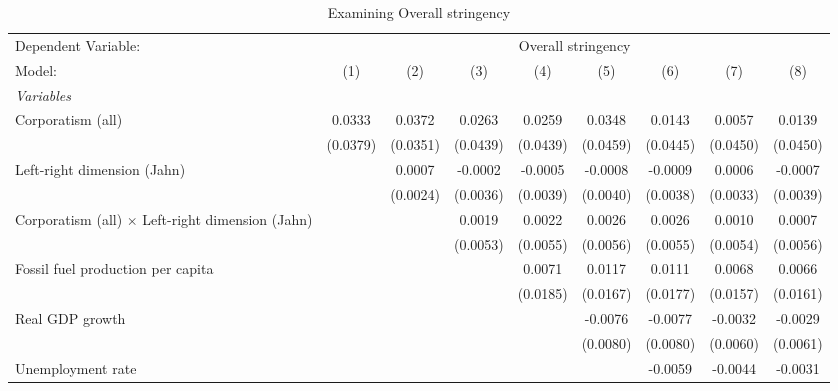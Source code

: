 
\begin{table}[htbp]
   \caption{Examining Overall stringency}
   \centering
   \begin{tabular}{lcccccccc}
      \tabularnewline \midrule \midrule
      Dependent Variable: & \multicolumn{8}{c}{Overall stringency}\\
      Model:                                                  & (1)      & (2)      & (3)      & (4)      & (5)      & (6)      & (7)      & (8)\\  
      \midrule
      \emph{Variables}\\
      Corporatism (all)                                       & 0.0333   & 0.0372   & 0.0263   & 0.0259   & 0.0348   & 0.0143   & 0.0057   & 0.0139\\   
                                                              & (0.0379) & (0.0351) & (0.0439) & (0.0439) & (0.0459) & (0.0445) & (0.0450) & (0.0450)\\   
      Left-right dimension (Jahn)                             &          & 0.0007   & -0.0002  & -0.0005  & -0.0008  & -0.0009  & 0.0006   & -0.0007\\   
                                                              &          & (0.0024) & (0.0036) & (0.0039) & (0.0040) & (0.0038) & (0.0033) & (0.0039)\\   
      Corporatism (all) $\times$ Left-right dimension (Jahn)  &          &          & 0.0019   & 0.0022   & 0.0026   & 0.0026   & 0.0010   & 0.0007\\   
                                                              &          &          & (0.0053) & (0.0055) & (0.0056) & (0.0055) & (0.0054) & (0.0056)\\   
      Fossil fuel production per capita                       &          &          &          & 0.0071   & 0.0117   & 0.0111   & 0.0068   & 0.0066\\   
                                                              &          &          &          & (0.0185) & (0.0167) & (0.0177) & (0.0157) & (0.0161)\\   
      Real GDP growth                                         &          &          &          &          & -0.0076  & -0.0077  & -0.0032  & -0.0029\\   
                                                              &          &          &          &          & (0.0080) & (0.0080) & (0.0060) & (0.0061)\\   
      Unemployment rate                                       &          &          &          &          &          & -0.0059  & -0.0044  & -0.0031\\   

\end{tabular}
\end{table}

